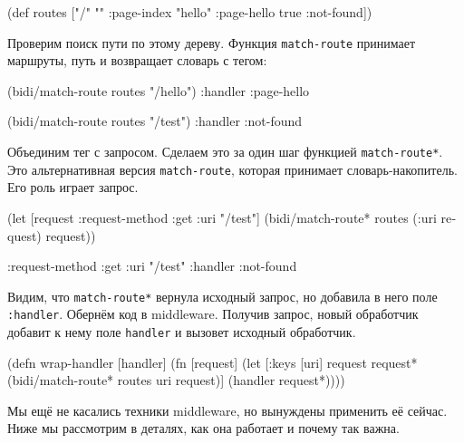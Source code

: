 \begin{english}
  \begin{clojure}
(def routes
  ["/" {""      :page-index
        "hello" :page-hello
        true    :not-found}])
  \end{clojure}
\end{english}


Проверим поиск пути по этому дереву. Функция \verb|match-route| принимает
маршруты, путь и возвращает словарь с тегом:

\begin{english}
  \begin{clojure}
(bidi/match-route routes "/hello")
{:handler :page-hello}

(bidi/match-route routes "/test")
{:handler :not-found}
  \end{clojure}
\end{english}


Объединим тег с запросом. Сделаем это за один шаг функцией
\verb|match-route*|. Это альтернативная версия \verb|match-route|, которая
принимает словарь-накопитель. Его роль играет запрос.

\begin{english}
  \begin{clojure}
(let [request {:request-method :get
               :uri "/test"}]
  (bidi/match-route* routes (:uri request) request))

{:request-method :get
 :uri "/test"
 :handler :not-found}
  \end{clojure}
\end{english}

Видим, что \verb|match-route*| вернула исходный запрос, но добавила в него
поле \verb|:handler|. Обернём код в middleware. Получив запрос, новый
обработчик добавит к нему поле \verb|handler| и вызовет исходный обработчик.

\begin{english}
  \begin{clojure}
(defn wrap-handler [handler]
  (fn [request]
    (let [{:keys [uri]} request
          request* (bidi/match-route* routes uri request)]
      (handler request*))))
  \end{clojure}
\end{english}

Мы ещё не касались техники middleware, но вынуждены применить её сейчас. Ниже мы
рассмотрим в деталях, как она работает и почему так важна.

